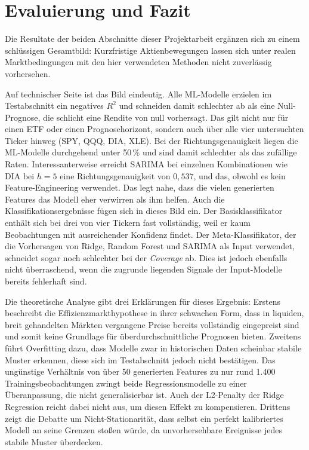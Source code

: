 \documentclass[12pt]{article}
\begin{document}
\clearpage

\clearpage

\clearpage

\section{Evaluierung und Fazit}

Die Resultate der beiden Abschnitte dieser Projektarbeit ergänzen sich zu einem schlüssigen Gesamtbild: Kurzfristige Aktienbewegungen lassen sich unter realen Marktbedingungen mit den hier verwendeten Methoden nicht zuverlässig vorhersehen.

Auf technischer Seite ist das Bild eindeutig. Alle ML-Modelle erzielen im Testabschnitt ein negatives $R^2$ und schneiden damit schlechter ab als eine Null-Prognose, die schlicht eine Rendite von null vorhersagt. Das gilt nicht nur für einen ETF oder einen Prognosehorizont, sondern auch über alle vier untersuchten Ticker hinweg (SPY, QQQ, DIA, XLE). Bei der Richtungsgenauigkeit liegen die ML-Modelle durchgehend unter 50\,\% und sind damit schlechter als das zufällige Raten. Interessanterweise erreicht SARIMA bei einzelnen Kombinationen wie DIA bei $h=5$ eine Richtungsgenauigkeit von $0{,}537$, und das, obwohl es kein Feature-Engineering verwendet. Das legt nahe, dass die vielen generierten Features das Modell eher verwirren als ihm helfen.\newline
Auch die Klassifikationsergebnisse fügen sich in dieses Bild ein. Der Basisklassifikator enthält sich bei drei von vier Tickern fast vollständig, weil er kaum Beobachtungen mit ausreichender Konfidenz findet. Der Meta-Klassifikator, der die Vorhersagen von Ridge, Random Forest und SARIMA als Input verwendet, schneidet sogar noch schlechter bei der \textit{Coverage} ab. Dies ist jedoch ebenfalls nicht überraschend, wenn die zugrunde liegenden Signale der Input-Modelle bereits fehlerhaft sind.

Die theoretische Analyse gibt drei Erklärungen für dieses Ergebnis:\newline
Erstens beschreibt die Effizienzmarkthypothese in ihrer schwachen Form, dass in liquiden, breit gehandelten Märkten vergangene Preise bereits vollständig eingepreist sind und somit keine Grundlage für überdurchschnittliche Prognosen bieten.\newline
Zweitens führt Overfitting dazu, dass Modelle zwar in historischen Daten scheinbar stabile Muster erkennen, diese sich im Testabschnitt jedoch nicht bestätigen. Das ungünstige Verhältnis von über 50 generierten Features zu nur rund 1.400 Trainingsbeobachtungen zwingt beide Regressionsmodelle zu einer Überanpassung, die nicht generalisierbar ist. Auch der L2-Penalty der Ridge Regression reicht dabei nicht aus, um diesen Effekt zu kompensieren.\newline
Drittens zeigt die Debatte um Nicht-Stationarität, dass selbst ein perfekt kalibriertes Modell an seine Grenzen stoßen würde, da unvorhersehbare Ereignisse jedes stabile Muster überdecken.
\end{document}
